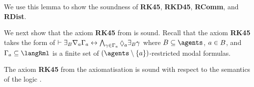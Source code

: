 We use this lemma to show the soundness of {\bf RK45}, {\bf RKD45}, {\bf RComm}, and {\bf RDist}.

We next show that the axiom {\bf RK45} from \axiomRmlKFF{} is sound.
Recall that the axiom {\bf RK45} takes the form of $\proves \somerefsBs \coversA \Gamma_\agentA \iff \bigwedge_{\gamma \in \Gamma_\agentA} \possibleA \somerefsBs \gamma$ where $\agentsB \subseteq \agents$, $a \in B$, and $\Gamma_\agentA \subseteq \langRml$ is a finite set of $(\agents \setminus \{\agentA\})$-restricted modal formulas.

\begin{lemma}\label{rml-k45-rk45}
The axiom {\bf RK45} from the axiomatisation \axiomRmlKFF{} is sound with respect to the semantics of the logic \logicRmlKFF{}.
\end{lemma}

